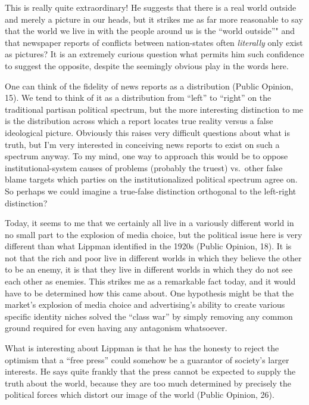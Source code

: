 \documentclass[12pt,book]{article}
\begin{document}
This is really quite extraordinary! He suggests that there is a real
world outside and merely a picture in our heads, but it strikes me as
far more reasonable to say that the world we live in with the people
around us is the ``world outside''" and that newspaper reports of
conflicts between nation-states often \emph{literally} only exist as
pictures? It is an extremely curious question what permits him such
confidence to suggest the opposite, despite the seemingly obvious play
in the words here.

One can think of the fidelity of news reports as a distribution (Public
Opinion, 15). We tend to think of it as a distribution from ``left'' to
``right'' on the traditional partisan political spectrum, but the more
interesting distinction to me is the distribution across which a report
locates true reality versus a false ideological picture. Obviously this
raises very difficult questions about what is truth, but I'm very
interested in conceiving news reports to exist on such a spectrum
anyway. To my mind, one way to approach this would be to oppose
institutional-system causes of problems (probably the truest) vs.~other
false blame targets which parties on the institutionalized political
spectrum agree on. So perhaps we could imagine a true-false distinction
orthogonal to the left-right distinction?

Today, it seems to me that we certainly all live in a variously
different world in no small part to the explosion of media choice, but
the political issue here is very different than what Lippman identified
in the 1920s (Public Opinion, 18). It is not that the rich and poor live
in different worlds in which they believe the other to be an enemy, it
is that they live in different worlds in which they do not see each
other as enemies. This strikes me as a remarkable fact today, and it
would have to be determined how this came about. One hypothesis might be
that the market's explosion of media choice and advertising's ability to
create various specific identity niches solved the ``class war'' by
simply removing any common ground required for even having any
antagonism whatsoever.

What is interesting about Lippman is that he has the honesty to reject
the optimism that a ``free press'' could somehow be a guarantor of
society's larger interests. He says quite frankly that the press cannot
be expected to supply the truth about the world, because they are too
much determined by precisely the political forces which distort our
image of the world (Public Opinion, 26).
\end{document}
